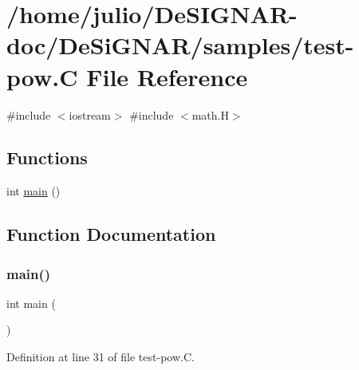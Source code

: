 \hypertarget{test-pow_8_c}{}\section{/home/julio/\+De\+S\+I\+G\+N\+A\+R-\/doc/\+De\+Si\+G\+N\+A\+R/samples/test-\/pow.C File Reference}
\label{test-pow_8_c}
{\ttfamily \#include $<$iostream$>$}\newline
{\ttfamily \#include $<$math.\+H$>$}\newline
\subsection*{Functions}
\begin{DoxyCompactItemize}
\item 
int \hyperlink{test-pow_8_c_ae66f6b31b5ad750f1fe042a706a4e3d4}{main} ()
\end{DoxyCompactItemize}


\subsection{Function Documentation}
\mbox{\label{test-pow_8_c_ae66f6b31b5ad750f1fe042a706a4e3d4}} 
\subsubsection{\texorpdfstring{main()}{main()}}
{\footnotesize\ttfamily int main (\begin{DoxyParamCaption}{ }\end{DoxyParamCaption})}



Definition at line 31 of file test-\/pow.\+C.

